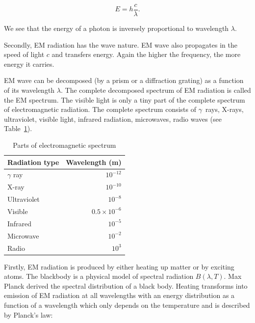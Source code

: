 \begin{equation}
	E = h \frac{c}{\lambda}.
	\label{energy_wavelength}
\end{equation}

We see that the energy of a photon is inversely proportional to wavelength \(\lambda\).~\cite{trypsteen2017}

Secondly, EM radiation has the wave nature. 
EM wave also propagates in the speed of light \(c\) and transfers energy.
Again the higher the frequency, the more energy it carries.~\cite{cochard2018}

EM wave can be decomposed (by a prism or a diffraction grating) as a function of its wavelength \(\lambda\).
The complete decomposed spectrum of EM radiation is called the EM spectrum.
The visible light is only a tiny part of the complete spectrum of electromagnetic radiation.
The complete spectrum consists of \(\gamma\)~rays, X-rays, ultraviolet, visible light, infrared radiation, microwaves, radio waves (see Table~\ref{em_spectrum}).

\begin{table}
\begin{center}
\begin{tabular}{|l|r|}
	\hline
	Radiation type & Wavelength (m) \\ \hline \hline
	\(\gamma\) ray & \(10^{-12}\) \\ \hline
	X-ray & \(10^{-10}\) \\ \hline
	Ultraviolet & \(10^{-8}\) \\ \hline
	Visible & \(0.5 \times 10^{-6}\) \\ \hline
	Infrared & \(10^{-5}\) \\ \hline
	Microwave & \(10^{-2}\) \\ \hline
	Radio & \(10^{3}\) \\ \hline
\end{tabular}
\end{center}
\caption{Parts of electromagnetic spectrum}
\label{em_spectrum}
\end{table}

Firstly, EM radiation is produced by either heating up matter or by exciting atoms.
The blackbody is a physical model of spectral radiation \(B(\lambda, T)\).
Max Planck derived the spectral distribution of a black body.
Heating transforms into emission of EM radiation at all wavelengths
with an energy distribution as a function of a wavelength
which only depends on the temperature and is described by Planck's law:

